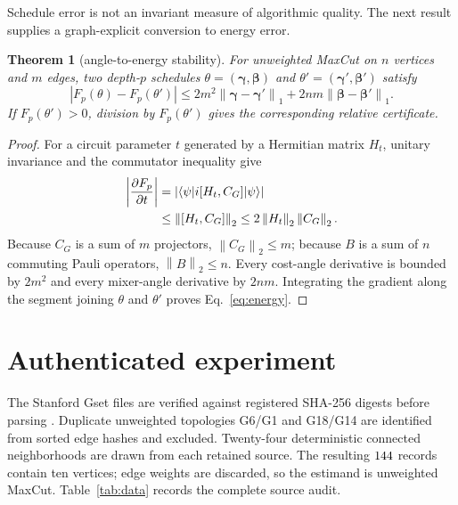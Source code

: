 \documentclass[10pt,letterpaper,twoside]{article}
\newtheorem{theorem}{Theorem}
\newcommand{\norm}[1]{\left\lVert #1\right\rVert}
\begin{document}
Schedule error is not an invariant measure of algorithmic quality.  The next
result supplies a graph-explicit conversion to energy error.

\begin{theorem}[angle-to-energy stability]
\label{thm:energy}
For unweighted MaxCut on $n$ vertices and $m$ edges, two depth-$p$ schedules
$\theta=(\bm\gamma,\bm\beta)$ and
$\theta'=(\bm\gamma',\bm\beta')$ satisfy
\begin{equation}
 |F_p(\theta)-F_p(\theta')|
 \le 2m^2\norm{\bm\gamma-\bm\gamma'}_1
     +2nm\norm{\bm\beta-\bm\beta'}_1.              \label{eq:energy}
\end{equation}
If $F_p(\theta')>0$, division by $F_p(\theta')$ gives the corresponding
relative certificate.
\end{theorem}

\begin{proof}
For a circuit parameter $t$ generated by a Hermitian matrix $H_t$,
unitary invariance and the commutator inequality give
\begin{align}
 \left|\frac{\partial F_p}{\partial t}\right|
 &=|\langle\psi|i[H_t,C_G]|\psi\rangle|\notag\\
 &\le\norm{[H_t,C_G]}_2
 \le2\norm{H_t}_2\norm{C_G}_2.
\end{align}
Because $C_G$ is a sum of $m$ projectors, $\norm{C_G}_2\le m$; because
$B$ is a sum of $n$ commuting Pauli operators, $\norm{B}_2\le n$.
Every cost-angle derivative is bounded by $2m^2$ and every mixer-angle
derivative by $2nm$.  Integrating the gradient along the segment joining
$\theta$ and $\theta'$ proves Eq.~\eqref{eq:energy}.
\end{proof}

\section{Authenticated experiment}

The Stanford Gset files are verified against registered SHA-256 digests before
parsing \cite{Gset}.  Duplicate unweighted topologies G6/G1 and G18/G14 are
identified from sorted edge hashes and excluded.  Twenty-four deterministic
connected neighborhoods are drawn from each retained source.  The resulting
$144$ records contain ten vertices; edge weights are discarded, so
the estimand is unweighted MaxCut.  Table~\ref{tab:data} records the complete
source audit.


\end{document}
